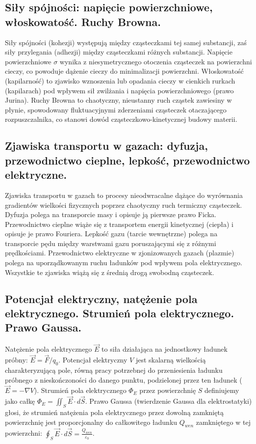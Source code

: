\documentclass[11pt,a4paper]{article}
\begin{document}
\subsection{Siły spójności: napięcie powierzchniowe, włoskowatość. Ruchy Browna.}
Siły spójności (kohezji) występują między cząsteczkami tej samej substancji, zaś siły przylegania (adhezji) między cząsteczkami różnych substancji. Napięcie powierzchniowe $\sigma$ wynika z niesymetrycznego otoczenia cząsteczek na powierzchni cieczy, co powoduje dążenie cieczy do minimalizacji powierzchni. Włoskowatość (kapilarność) to zjawisko wznoszenia lub opadania cieczy w cienkich rurkach (kapilarach) pod wpływem sił zwilżania i napięcia powierzchniowego (prawo Jurina). Ruchy Browna to chaotyczny, nieustanny ruch cząstek zawiesiny w płynie, spowodowany fluktuacyjnymi zderzeniami cząsteczek otaczającego rozpuszczalnika, co stanowi dowód cząsteczkowo-kinetycznej budowy materii.

\subsection{Zjawiska transportu w gazach: dyfuzja, przewodnictwo cieplne, lepkość, przewodnictwo elektryczne.}
Zjawiska transportu w gazach to procesy nieodwracalne dążące do wyrównania gradientów wielkości fizycznych poprzez chaotyczny ruch termiczny cząsteczek. Dyfuzja polega na transporcie masy i opisuje ją pierwsze prawo Ficka. Przewodnictwo cieplne wiąże się z transportem energii kinetycznej (ciepła) i opisuje je prawo Fouriera. Lepkość gazu (tarcie wewnętrzne) polega na transporcie pędu między warstwami gazu poruszającymi się z różnymi prędkościami. Przewodnictwo elektryczne w zjonizowanych gazach (plazmie) polega na uporządkowanym ruchu ładunków pod wpływem pola elektrycznego. Wszystkie te zjawiska wiążą się z średnią drogą swobodną cząsteczek.

\subsection{Potencjał elektryczny, natężenie pola elektrycznego. Strumień pola elektrycznego. Prawo Gaussa.}
Natężenie pola elektrycznego $\vec{E}$ to siła działająca na jednostkowy ładunek próbny: $\vec{E} = \vec{F}/q_0$. Potencjał elektryczny $V$ jest skalarną wielkością charakteryzującą pole, równą pracy potrzebnej do przeniesienia ładunku próbnego z nieskończoności do danego punktu, podzielonej przez ten ładunek ($\vec{E} = -\nabla V$). Strumień pola elektrycznego $\Phi_E$ przez powierzchnię $S$ definiujemy jako całkę $\Phi_E = \iint_S \vec{E} \cdot d\vec{S}$. Prawo Gaussa (twierdzenie Gaussa dla elektrostatyki) głosi, że strumień natężenia pola elektrycznego przez dowolną zamkniętą powierzchnię jest proporcjonalny do całkowitego ładunku $Q_{wen}$ zamkniętego w tej powierzchni: $\oint_S \vec{E} \cdot d\vec{S} = \frac{Q_{wen}}{\varepsilon_0}$.
\end{document}
